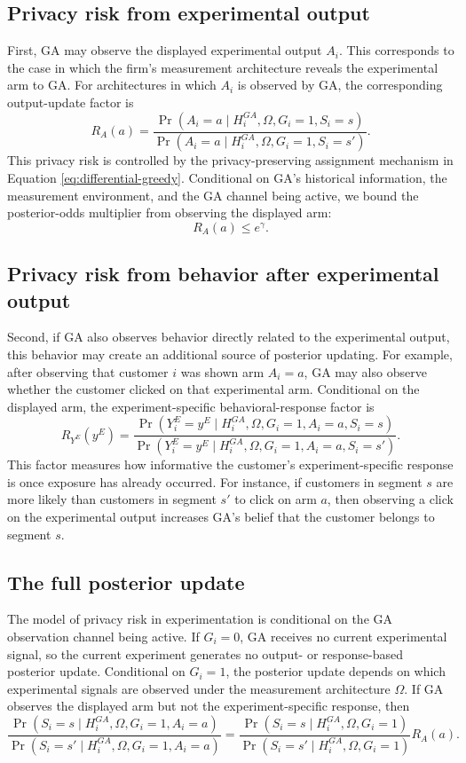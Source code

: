 \documentclass[mksc,nonblindrev]{informs3}
\begin{document}
\begin{APPENDICES}
\subsection{Privacy risk from experimental output}
First, GA may observe the displayed experimental output \(A_i\). This corresponds to the case in which the firm's measurement architecture reveals the experimental arm to GA. For architectures in which \(A_i\) is observed by GA, the corresponding output-update factor is
\[
R_A(a)
=
\frac{
\Pr(A_i=a\mid H_i^{GA},\Omega,G_i=1,S_i=s)
}{
\Pr(A_i=a\mid H_i^{GA},\Omega,G_i=1,S_i=s')
}.
\]
This privacy risk is controlled by the privacy-preserving assignment mechanism in Equation \eqref{eq:differential-greedy}. Conditional on GA's historical information, the measurement environment, and the GA channel being active, we bound the posterior-odds multiplier from observing the displayed arm:
\[
R_A(a)\leq e^\gamma.
\]


\subsection{Privacy risk from behavior after experimental output}
Second, if GA also observes behavior directly related to the experimental output, this behavior may create an additional source of posterior updating. For example, after observing that customer \(i\) was shown arm \(A_i=a\), GA may also observe whether the customer clicked on that experimental arm. Conditional on the displayed arm, the experiment-specific behavioral-response factor is
\[
R_{Y^E}(y^E)
=
\frac{
\Pr(Y_i^E=y^E\mid H_i^{GA},\Omega,G_i=1,A_i=a,S_i=s)
}{
\Pr(Y_i^E=y^E\mid H_i^{GA},\Omega,G_i=1,A_i=a,S_i=s')
}.
\]
This factor measures how informative the customer's experiment-specific response is once exposure has already occurred. For instance, if customers in segment \(s\) are more likely than customers in segment \(s'\) to click on arm \(a\), then observing a click on the experimental output increases GA's belief that the customer belongs to segment \(s\).

\subsection{The full posterior update}
The model of privacy risk in experimentation is conditional on the GA observation channel being active. If \(G_i=0\), GA receives no current experimental signal, so the current experiment generates no output- or response-based posterior update. Conditional on \(G_i=1\), the posterior update depends on which experimental signals are observed under the measurement architecture \(\Omega\). If GA observes the displayed arm but not the experiment-specific response, then
\[
\frac{
\Pr(S_i=s\mid H_i^{GA},\Omega,G_i=1,A_i=a)
}{
\Pr(S_i=s'\mid H_i^{GA},\Omega,G_i=1,A_i=a)
}
=
\frac{
\Pr(S_i=s\mid H_i^{GA},\Omega,G_i=1)
}{
\Pr(S_i=s'\mid H_i^{GA},\Omega,G_i=1)
}
R_A(a).
\]


\end{APPENDICES}
\end{document}
